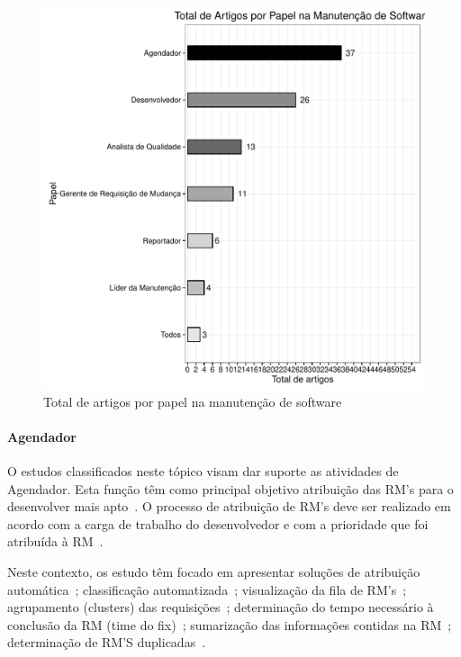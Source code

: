 \begin{figure}[htpb]
	\centering
	\includegraphics[width=0.8\linewidth]{chapter-mapeamento-sistematico/img/grafico_papel_por_artigo.pdf}
	\caption{Total de artigos por papel na manutenção de software}\label{fig:graf_papel_por_artigo}
\end{figure}

\paragraph{Agendador}
O estudos classificados neste tópico visam dar suporte as atividades de
Agendador. Esta função têm como principal objetivo atribuição das RM’s
para o desenvolver mais apto~\cite{banitaan2013decoba}. O processo de atribuição
de RM's deve ser realizado em acordo com a carga de trabalho do desenvolvedor e
com a prioridade que foi atribuída à RM~\cite{chawla2015automated}. 

Neste contexto, os estudo têm focado em apresentar soluções de atribuição
automática~\cite{banitaan2013decoba, shokripour2012automatic,
	somasundaram2012automatici,Naguib2013, Zhang2014, Zanetti2013}; classificação
automatizada~\cite{gegick2010identifying,liu2014faceted, behl2014bug,
	chawla2015automated,tian2015automated}; visualização da
fila de RM's~\cite{izquierdo2015gila}; agrupamento (clusters) das
requisições~\cite{liu2014faceted}; determinação do tempo necessário à conclusão
da RM (time do fix)~\cite{hosseini2012market,
	Bhattacharya:2011:BTP:1985441.1985472}; sumarização das informações
contidas na RM~\cite{mani2012ausum}; determinação de RM'S
duplicadas~\cite{Sun2011, Wu2011a}.

